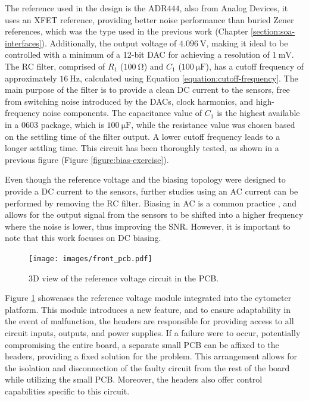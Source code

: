 The reference used in the design is the $\mathrm{ADR444}$, also from Analog Devices, it uses an XFET reference, providing better noise performance than buried Zener references, which was the type used in the previous work (Chapter \ref{section:soa-interfaces}). Additionally, the output voltage of $\mathrm{4.096~V}$, making it ideal to be controlled with a minimum of a 12-bit \ac{DAC} for achieving a resolution of $\mathrm{1~mV}$. The \ac{RC} filter, comprised of $R_1$ ($\mathrm{100~\Omega}$) and $C_1$ ($\mathrm{100~\mu F}$), has a cutoff frequency of approximately $\mathrm{16~Hz}$, calculated using Equation \ref{equation:cutoff-frequency}. The main purpose of the filter is to provide a clean \ac{DC} current to the sensors, free from switching noise introduced by the \ac{DAC}s, clock harmonics, and high-frequency noise components. The capacitance value of $C_1$ is the highest available in a 0603 package, which is $\mathrm{100~\mu F}$, while the resistance value was chosen based on the settling time of the filter output. A lower cutoff frequency leads to a longer settling time. This circuit has been thoroughly tested, as shown in a previous figure (Figure \ref{figure:bias-exercise}).

Even though the reference voltage and the biasing topology were designed to provide a \ac{DC} current to the sensors, further studies using an \ac{AC} current can be performed by removing the \ac{RC} filter. Biasing in \ac{AC} is a common practice \cite{8526523, PMID24761029, TIM.2013.2296417}, and allows for the output signal from the sensors to be shifted into a higher frequency where the noise is lower, thus improving the \ac{SNR}. However, it is important to note that this work focuses on \ac{DC} biasing.

\begin{figure}[!ht]
    \centering
    \texttt{[image: images/front\_pcb.pdf]}
    \caption{3D view of the reference voltage circuit in the PCB.}
    \label{figure:vref-pcb}
\end{figure}

Figure \ref{figure:vref-pcb} showcases the reference voltage module integrated into the cytometer platform. This module introduces a new feature, and to ensure adaptability in the event of malfunction, the headers are responsible for providing access to all circuit inputs, outputs, and power supplies. If a failure were to occur, potentially compromising the entire board, a separate small \ac{PCB} can be affixed to the headers, providing a fixed solution for the problem. This arrangement allows for the isolation and disconnection of the faulty circuit from the rest of the board while utilizing the small \ac{PCB}. Moreover, the headers also offer control capabilities specific to this circuit.

